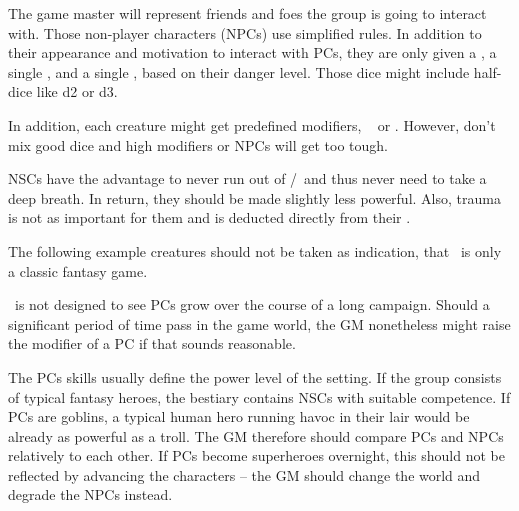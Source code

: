 {		\noindent
		The game master will represent friends and foes the group is going to interact with. Those non-player characters (NPCs) use simplified rules. In addition to their appearance and motivation to interact with PCs, they are only given a \HD, a single \AD, and a single \RD, based on their danger level. Those dice might include half-dice like d2 or d3.

		\nipajinTableNSC

		\noindent
		In addition, each creature might get predefined modifiers, \eg\  or . However, don't mix good dice and high modifiers or NPCs will get too tough.

		NSCs have the advantage to never run out of \AD/\RD\ and thus never need to take a deep breath. In return, they should be made slightly less powerful. Also, trauma is not as important for them and is deducted directly from their \HD.


		\noindent
		The following example creatures should not be taken as indication, that \nipajin\ is only a classic fantasy game.

		\nipajinTableBestiary


		\noindent
		\nipajin\ is not designed to see PCs grow over the course of a long campaign. Should a significant period of time pass in the game world, the GM nonetheless might raise the modifier of a PC if that sounds reasonable.

		The PCs skills usually define the power level of the setting. If the group consists of typical fantasy heroes, the bestiary contains NSCs with suitable competence. If PCs are goblins, a typical human hero running havoc in their lair would be already as powerful as a troll. The GM therefore should compare PCs and NPCs relatively to each other. If PCs become superheroes overnight, this should not be reflected by advancing the characters -- the GM should change the world and degrade the NPCs instead.

}
